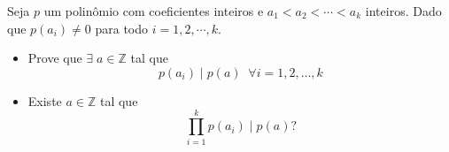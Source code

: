 Seja \(p\) um polinômio com coeficientes inteiros e \(a_1<a_2<\cdots <a_k\) inteiros. Dado que \(p(a_i)\ne 0\) para todo \(i=1,2,\cdots, k\).
\begin{itemize}
  \item Prove que \(\exists\; a\in \mathbb{Z}\) tal que \[ p(a_i)\mid p(a)\;\;\forall i=1,2,\dots ,k \]
  \item Existe \(a\in \mathbb{Z}\) tal que \[ \prod_{i=1}^{k}p(a_i)\mid p(a)?\]
\end{itemize}
